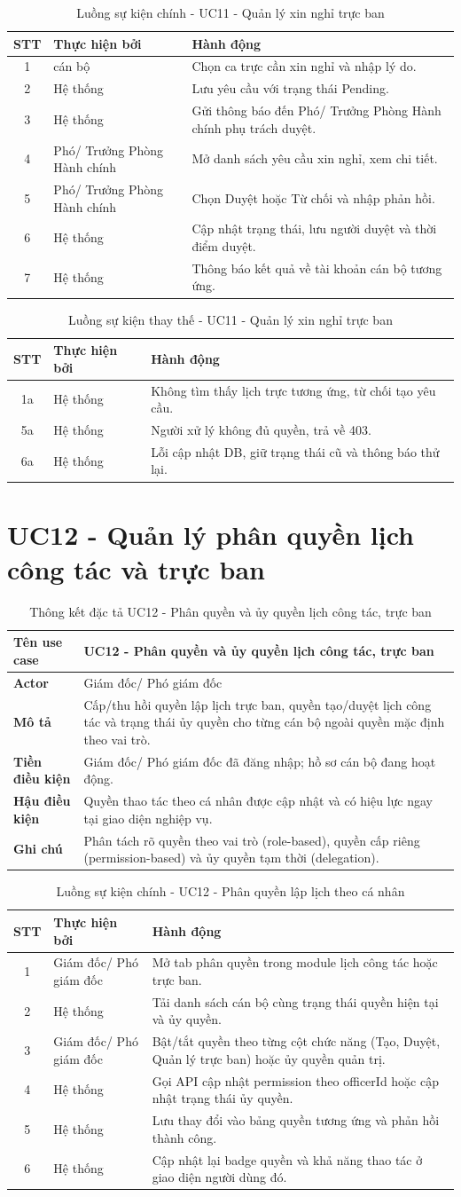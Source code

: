 \documentclass[18pt,a4paper]{report}
\newcommand{\specinfo}[6]{
\begin{table}[H]
\centering
\caption{Thông kết đặc tả #1}
\begin{tabularx}{\textwidth}{|>{\raggedright\arraybackslash}p{3.2cm}|X|}
\hline
\textbf{Tên use case} & #1 \\ \hline
\textbf{Actor} & #2 \\ \hline
\textbf{Mô tả} & #3 \\ \hline
\textbf{Tiền điều kiện} & #4 \\ \hline
\textbf{Hậu điều kiện} & #5 \\ \hline
\textbf{Ghi chú} & #6 \\ \hline
\end{tabularx}
\end{table}
}
\newcommand{\mainflowtable}[1]{
\begin{table}[H]
\centering
\caption{Luồng sự kiện chính - #1}
\begin{tabularx}{\textwidth}{|c|>{\raggedright\arraybackslash}p{3cm}|X|}
\hline
\textbf{STT} & \textbf{Thực hiện bởi} & \textbf{Hành động} \\ \hline
}
\newcommand{\altflowtable}[1]{
\begin{table}[H]
\centering
\caption{Luồng sự kiện thay thế - #1}
\begin{tabularx}{\textwidth}{|c|>{\raggedright\arraybackslash}p{3cm}|X|}
\hline
\textbf{STT} & \textbf{Thực hiện bởi} & \textbf{Hành động} \\ \hline
}
\begin{document}
\mainflowtable{UC11 - Quản lý xin nghỉ trực ban}
1 & cán bộ & Chọn ca trực cần xin nghỉ và nhập lý do. \\ \hline
2 & Hệ thống & Lưu yêu cầu với trạng thái Pending. \\ \hline
3 & Hệ thống & Gửi thông báo đến Phó/ Trưởng Phòng Hành chính phụ trách duyệt. \\ \hline
4 & Phó/ Trưởng Phòng Hành chính & Mở danh sách yêu cầu xin nghỉ, xem chi tiết. \\ \hline
5 & Phó/ Trưởng Phòng Hành chính & Chọn Duyệt hoặc Từ chối và nhập phản hồi. \\ \hline
6 & Hệ thống & Cập nhật trạng thái, lưu người duyệt và thời điểm duyệt. \\ \hline
7 & Hệ thống & Thông báo kết quả về tài khoản cán bộ tương ứng. \\ \hline
\end{tabularx}
\end{table}

\altflowtable{UC11 - Quản lý xin nghỉ trực ban}
1a & Hệ thống & Không tìm thấy lịch trực tương ứng, từ chối tạo yêu cầu. \\ \hline
5a & Hệ thống & Người xử lý không đủ quyền, trả về 403. \\ \hline
6a & Hệ thống & Lỗi cập nhật DB, giữ trạng thái cũ và thông báo thử lại. \\ \hline
\end{tabularx}
\end{table}

\section{UC12 - Quản lý phân quyền lịch công tác và trực ban}
\specinfo
{UC12 - Phân quyền và ủy quyền lịch công tác, trực ban}
{Giám đốc/ Phó giám đốc}
{Cấp/thu hồi quyền lập lịch trực ban, quyền tạo/duyệt lịch công tác và trạng thái ủy quyền cho từng cán bộ ngoài quyền mặc định theo vai trò.}
{Giám đốc/ Phó giám đốc đã đăng nhập; hồ sơ cán bộ đang hoạt động.}
{Quyền thao tác theo cá nhân được cập nhật và có hiệu lực ngay tại giao diện nghiệp vụ.}
{Phân tách rõ quyền theo vai trò (role-based), quyền cấp riêng (permission-based) và ủy quyền tạm thời (delegation).}

\mainflowtable{UC12 - Phân quyền lập lịch theo cá nhân}
1 & Giám đốc/ Phó giám đốc & Mở tab phân quyền trong module lịch công tác hoặc trực ban. \\ \hline
2 & Hệ thống & Tải danh sách cán bộ cùng trạng thái quyền hiện tại và ủy quyền. \\ \hline
3 & Giám đốc/ Phó giám đốc & Bật/tắt quyền theo từng cột chức năng (Tạo, Duyệt, Quản lý trực ban) hoặc ủy quyền quản trị. \\ \hline
4 & Hệ thống & Gọi API cập nhật permission theo officerId hoặc cập nhật trạng thái ủy quyền. \\ \hline
5 & Hệ thống & Lưu thay đổi vào bảng quyền tương ứng và phản hồi thành công. \\ \hline
6 & Hệ thống & Cập nhật lại badge quyền và khả năng thao tác ở giao diện người dùng đó. \\ \hline
\end{tabularx}
\end{table}
\end{document}
